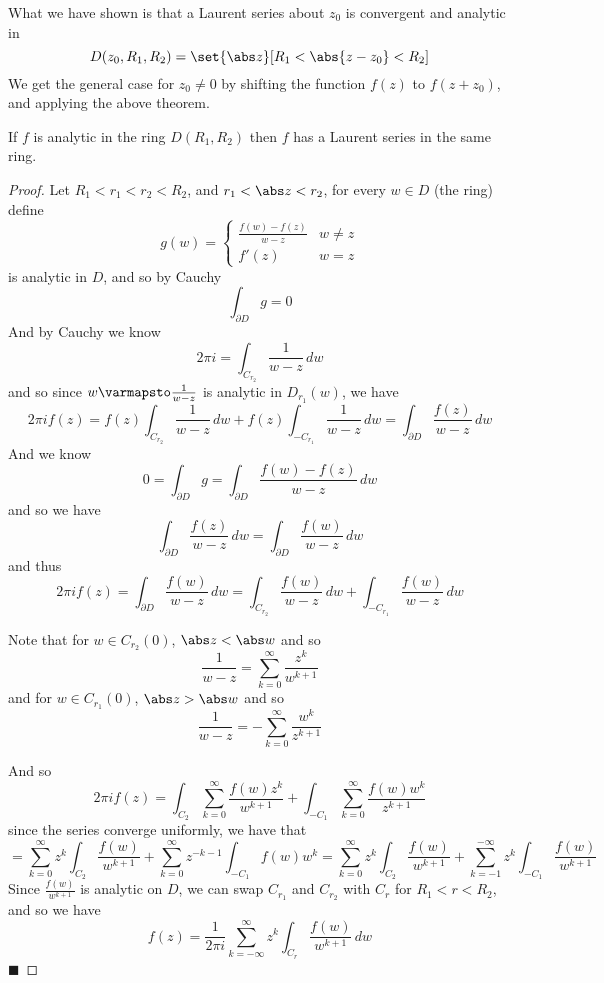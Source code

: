 \documentclass[10pt]{article}
\def\qed{\hskip1cm\hbox{}\hfill$\blacksquare$}
\begin{document}
What we have shown is that a Laurent series about $z_0$ is convergent and analytic in
\[ D(z_0, R_1, R_2) = \set{\abs z}[R_1<\abs{z-z_0}<R_2] \]
We get the general case for $z_0\neq0$ by shifting the function $f(z)$ to $f(z+z_0)$, and applying the above theorem.

\begin{thrm*}

    If $f$ is analytic in the ring $D(R_1,R_2)$ then $f$ has a Laurent series in the same ring.

\end{thrm*}

\begin{proof}

    Let $R_1<r_1<r_2<R_2$, and $r_1<\abs z<r_2$, for every $w\in D$ (the ring) define
    \[ g(w) = \begin{cases} \frac{f(w)-f(z)}{w-z} & w\neq z \\ f'(z) & w=z \end{cases} \]
    is analytic in $D$, and so by Cauchy
    \[ \int_{\partial D}g = 0 \]
    And by Cauchy we know
    \[ 2\pi i = \int_{C_{r_2}}\frac1{w-z}\,dw \]
    and so since $w\varmapsto\frac1{w-z}$ is analytic in $D_{r_1}(w)$, we have
    \[ 2\pi if(z) = f(z)\int_{C_{r_2}}\frac1{w-z}\,dw + f(z)\int_{-C_{r_1}}\frac1{w-z}\,dw = \int_{\partial D}\frac{f(z)}{w-z}\,dw \]
    And we know
    \[ 0 = \int_{\partial D} g = \int_{\partial D}\frac{f(w)-f(z)}{w-z}\,dw \]
    and so we have
    \[ \int_{\partial D}\frac{f(z)}{w-z}\,dw = \int_{\partial D}\frac{f(w)}{w-z}\,dw \]
    and thus
    \[ 2\pi if(z) = \int_{\partial D}\frac{f(w)}{w-z}\,dw = \int_{C_{r_2}}\frac{f(w)}{w-z}\,dw + \int_{-C_{r_1}}\frac{f(w)}{w-z}\,dw \]

    Note that for $w\in C_{r_2}(0)$, $\abs z<\abs w$ and so
    \[ \frac1{w-z} = \sum_{k=0}^\infty\frac{z^k}{w^{k+1}} \]
    and for $w\in C_{r_1}(0)$, $\abs z>\abs w$ and so
    \[ \frac1{w-z} = -\sum_{k=0}^\infty\frac{w^k}{z^{k+1}} \]

    And so
    \[ 2\pi if(z) = \int_{C_2}\sum_{k=0}^\infty\frac{f(w)z^k}{w^{k+1}} + \int_{-C_1}\sum_{k=0}^\infty\frac{f(w)w^k}{z^{k+1}} \]
    since the series converge uniformly, we have that
    \[ = \sum_{k=0}^\infty z^k\int_{C_2}\frac{f(w)}{w^{k+1}} + \sum_{k=0}^\infty z^{-k-1}\int_{-C_1}f(w)w^k = \sum_{k=0}^\infty z^k\int_{C_2}\frac{f(w)}{w^{k+1}} +
    \sum_{k=-1}^{-\infty}z^k\int_{-C_1}\frac{f(w)}{w^{k+1}} \]
    Since $\frac{f(w)}{w^{k+1}}$ is analytic on $D$, we can swap $C_{r_1}$ and $C_{r_2}$ with $C_r$ for $R_1<r<R_2$, and so we have
    \[ f(z) = \frac1{2\pi i}\sum_{k=-\infty}^\infty z^k\int_{C_r}\frac{f(w)}{w^{k+1}}\,dw \]
    \qed


\end{proof}
\end{document}
